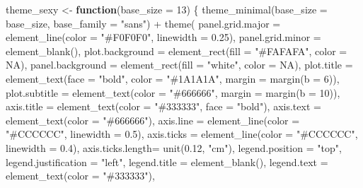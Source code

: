 \documentclass[
  letterpaper,
  DIV=11,
  numbers=noendperiod]{scrreprt}
\newenvironment{Shaded}{\begin{snugshade}}{\end{snugshade}}
\newcommand{\AttributeTok}[1]{\textcolor[rgb]{0.40,0.45,0.13}{#1}}
\newcommand{\ConstantTok}[1]{\textcolor[rgb]{0.56,0.35,0.01}{#1}}
\newcommand{\ControlFlowTok}[1]{\textcolor[rgb]{0.00,0.23,0.31}{\textbf{#1}}}
\newcommand{\DecValTok}[1]{\textcolor[rgb]{0.68,0.00,0.00}{#1}}
\newcommand{\FloatTok}[1]{\textcolor[rgb]{0.68,0.00,0.00}{#1}}
\newcommand{\FunctionTok}[1]{\textcolor[rgb]{0.28,0.35,0.67}{#1}}
\newcommand{\NormalTok}[1]{\textcolor[rgb]{0.00,0.23,0.31}{#1}}
\newcommand{\OtherTok}[1]{\textcolor[rgb]{0.00,0.23,0.31}{#1}}
\newcommand{\SpecialCharTok}[1]{\textcolor[rgb]{0.37,0.37,0.37}{#1}}
\newcommand{\StringTok}[1]{\textcolor[rgb]{0.13,0.47,0.30}{#1}}
\begin{document}
\begin{Shaded}
\begin{Highlighting}[]
\NormalTok{theme\_sexy }\OtherTok{\textless{}{-}} \ControlFlowTok{function}\NormalTok{(}\AttributeTok{base\_size =} \DecValTok{13}\NormalTok{) \{}
\FunctionTok{theme\_minimal}\NormalTok{(}\AttributeTok{base\_size =}\NormalTok{ base\_size, }\AttributeTok{base\_family =} \StringTok{"sans"}\NormalTok{) }\SpecialCharTok{+}
\FunctionTok{theme}\NormalTok{(}
\AttributeTok{panel.grid.major =} \FunctionTok{element\_line}\NormalTok{(}\AttributeTok{color =} \StringTok{"\#F0F0F0"}\NormalTok{, }\AttributeTok{linewidth =} \FloatTok{0.25}\NormalTok{),}
\AttributeTok{panel.grid.minor =} \FunctionTok{element\_blank}\NormalTok{(),}
\AttributeTok{plot.background  =} \FunctionTok{element\_rect}\NormalTok{(}\AttributeTok{fill =} \StringTok{"\#FAFAFA"}\NormalTok{, }\AttributeTok{color =} \ConstantTok{NA}\NormalTok{),}
\AttributeTok{panel.background =} \FunctionTok{element\_rect}\NormalTok{(}\AttributeTok{fill =} \StringTok{"white"}\NormalTok{, }\AttributeTok{color =} \ConstantTok{NA}\NormalTok{),}
\AttributeTok{plot.title       =} \FunctionTok{element\_text}\NormalTok{(}\AttributeTok{face =} \StringTok{"bold"}\NormalTok{, }\AttributeTok{color =} \StringTok{"\#1A1A1A"}\NormalTok{, }\AttributeTok{margin =} \FunctionTok{margin}\NormalTok{(}\AttributeTok{b =} \DecValTok{6}\NormalTok{)),}
\AttributeTok{plot.subtitle    =} \FunctionTok{element\_text}\NormalTok{(}\AttributeTok{color =} \StringTok{"\#666666"}\NormalTok{, }\AttributeTok{margin =} \FunctionTok{margin}\NormalTok{(}\AttributeTok{b =} \DecValTok{10}\NormalTok{)),}
\AttributeTok{axis.title       =} \FunctionTok{element\_text}\NormalTok{(}\AttributeTok{color =} \StringTok{"\#333333"}\NormalTok{, }\AttributeTok{face =} \StringTok{"bold"}\NormalTok{),}
\AttributeTok{axis.text        =} \FunctionTok{element\_text}\NormalTok{(}\AttributeTok{color =} \StringTok{"\#666666"}\NormalTok{),}
\AttributeTok{axis.line        =} \FunctionTok{element\_line}\NormalTok{(}\AttributeTok{color =} \StringTok{"\#CCCCCC"}\NormalTok{, }\AttributeTok{linewidth =} \FloatTok{0.5}\NormalTok{),}
\AttributeTok{axis.ticks       =} \FunctionTok{element\_line}\NormalTok{(}\AttributeTok{color =} \StringTok{"\#CCCCCC"}\NormalTok{, }\AttributeTok{linewidth =} \FloatTok{0.4}\NormalTok{),}
\AttributeTok{axis.ticks.length=} \FunctionTok{unit}\NormalTok{(}\FloatTok{0.12}\NormalTok{, }\StringTok{"cm"}\NormalTok{),}
\AttributeTok{legend.position  =} \StringTok{"top"}\NormalTok{,}
\AttributeTok{legend.justification =} \StringTok{"left"}\NormalTok{,}
\AttributeTok{legend.title     =} \FunctionTok{element\_blank}\NormalTok{(),}
\AttributeTok{legend.text      =} \FunctionTok{element\_text}\NormalTok{(}\AttributeTok{color =} \StringTok{"\#333333"}\NormalTok{),}

\end{Highlighting}
\end{Shaded}
\end{document}
